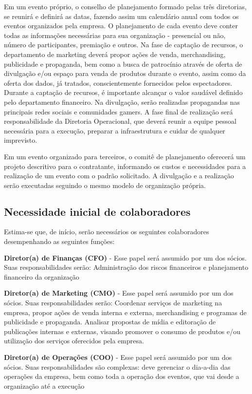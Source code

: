 \documentclass[a4paper, 12pt]{paper}
\begin{document}
Em um evento próprio, o conselho de planejamento formado pelas três diretorias, se reunirá e definirá as datas, fazendo assim um calendário anual com todos os eventos organizados pela empresa. O planejamento de cada evento deve conter todas as informações necessárias para sua organização - presencial ou não, número de participantes, premiação e outros. Na fase de captação de recursos, o departamento de marketing deverá propor ações de venda, merchandising, publicidade e propaganda, bem como a busca de patrocínio através de oferta de divulgação e/ou espaço para venda de produtos durante o evento, assim como da oferta dos dados, já tratados, conscientemente fornecidos pelos espectadores. Durante a captação de recursos, é importante alcançar o valor saudável definido pelo departamento financeiro. Na divulgação, serão realizadas propagandas nas principais redes sociais e comunidades gamers. A fase final de realização será responsabilidade da Diretoria Operacional, que deverá reunir a equipe pessoal necessária para a execução, preparar a infraestrutura e cuidar de qualquer imprevisto.

Em um evento organizado para terceiros, o comitê de planejamento oferecerá um projeto descritivo para o contratante, informando os custos e necessidades para a realização de um evento com o padrão solicitado. A divulgação e a realização serão executadas seguindo o mesmo modelo de organização própria.

\subsection{Necessidade inicial de colaboradores}
Estima-se que, de início, serão necessários os seguintes colaboradores desempenhando as seguintes funções:

\textbf{Diretor(a) de Finanças (CFO)} - Esse papel será assumido por um dos sócios. Suas responsabilidades serão: Administração dos riscos financeiros e planejamento financeiro da organização

\textbf{Diretor(a) de Marketing (CMO)} -  Esse papel será assumido por um dos sócios. Suas responsabilidades serão: Coordenar serviços de marketing na empresa,  propor ações de venda interna e externa, merchandising e programas de publicidade e propaganda. Analisar propostas de mídia e editoração de publicações internas e externas, visando promover o consumo de produtos e/ou utilização dos serviços oferecidos pela empresa.

\textbf{Diretor(a) de Operações (COO)} - Esse papel será assumido por um dos sócios. Suas responsabilidades são complexas: deve gerenciar o dia-a-dia das operações da empresa, bem como toda a operação dos eventos, que vai desde a organização até a execução
\end{document}
